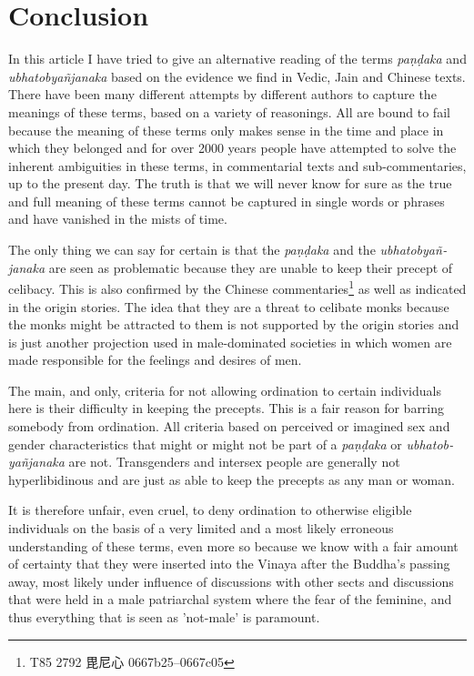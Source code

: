 \section{Conclusion}
In this article I have tried to give an alternative reading of the terms {\em paṇḍaka} and {\em ubhatob­yañ­janaka} based on the evidence we find in Vedic, Jain and Chinese texts. There have been many different attempts by different authors to capture the meanings of these terms, based on a variety of reasonings. All are bound to fail because the meaning of these terms only makes sense in the time and place in which they belonged and for over 2000 years people have attempted to solve the inherent ambiguities in these terms, in commentarial texts and sub-commentaries, up to the present day. The truth is that we will never know for sure as the true and full meaning of these terms cannot be captured in single words or phrases and have vanished in the mists of time. 

The only thing we can say for certain is that the {\em paṇḍaka} and the {\em ubhatob­yañ­janaka} are seen as problematic because they are unable to keep their precept of celibacy. This is also confirmed by the Chinese commentaries\footnote{T85 2792 毘尼心 0667b25–0667c05} as well as indicated in the origin stories. The idea that they are a threat to celibate monks because the monks might be attracted to them is not supported by the origin stories and is just another projection used in male-dominated societies in which women are made responsible for the feelings and desires of men. 

The main, and only, criteria for not allowing ordination to certain individuals here is their difficulty in keeping the precepts. This is a fair reason for barring somebody from ordination. All criteria based on perceived or imagined sex and gender characteristics that might or might not be part of a {\em paṇḍaka} or {\em ubhatob­yañ­janaka} are not. Transgenders and intersex people are generally not hyperlibidinous and are just as able to keep the precepts as any man or woman. 

It is therefore unfair, even cruel, to deny ordination to otherwise eligible individuals on the basis of a very limited and a most likely erroneous understanding of these terms, even more so because we know with a fair amount of certainty that they were inserted into the Vinaya after the Buddha's passing away, most likely under influence of discussions with other sects and discussions that were held in a male patriarchal system where the fear of the feminine, and thus everything that is seen as 'not-male' is paramount. 
